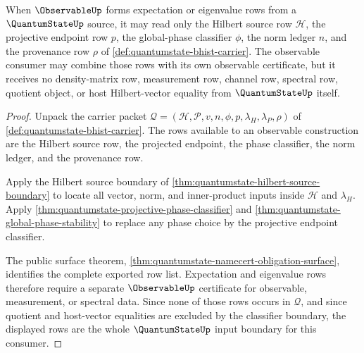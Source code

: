 \begin{theorem}
\label{thm:quantumstate-observable-expectation-row-boundary}
When $\ObservableUp$ forms expectation or eigenvalue rows from a
$\QuantumStateUp$ source, it may read only the Hilbert source row
$\mathcal{H}$, the projective endpoint row $p$, the global-phase classifier
$\phi$, the norm ledger $n$, and the provenance row $\rho$ of
\autoref{def:quantumstate-bhist-carrier}. The observable consumer may combine
those rows with its own observable certificate, but it receives no
density-matrix row, measurement row, channel row, spectral row, quotient
object, or host Hilbert-vector equality from $\QuantumStateUp$ itself.
\end{theorem}
\begin{proof}
Unpack the carrier packet
$\mathcal{Q}=(\mathcal{H},\mathcal{P},v,n,\phi,p,\lambda_H,\lambda_P,\rho)$
of \autoref{def:quantumstate-bhist-carrier}. The rows available to an
observable construction are the Hilbert source row, the projected endpoint, the
phase classifier, the norm ledger, and the provenance row.

Apply the Hilbert source boundary of
\autoref{thm:quantumstate-hilbert-source-boundary} to locate all vector,
norm, and inner-product inputs inside $\mathcal{H}$ and $\lambda_H$. Apply
\autoref{thm:quantumstate-projective-phase-classifier} and
\autoref{thm:quantumstate-global-phase-stability} to replace any phase choice
by the projective endpoint classifier.

The public surface theorem,
\autoref{thm:quantumstate-namecert-obligation-surface}, identifies the
complete exported row list. Expectation and eigenvalue rows therefore require a
separate $\ObservableUp$ certificate for observable, measurement, or spectral
data. Since none of those rows occurs in $\mathcal{Q}$, and since quotient and
host-vector equalities are excluded by the classifier boundary, the displayed
rows are the whole $\QuantumStateUp$ input boundary for this consumer.
\end{proof}

